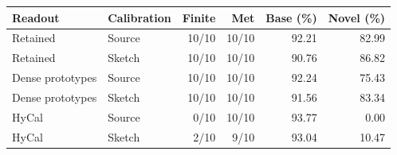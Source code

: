 \begin{tabular}{@{}llrrrr@{}}
\toprule
Readout & Calibration & Finite & Met & Base (\%) & Novel (\%) \\
\midrule
Retained & Source & 10/10 & 10/10 & 92.21 & 82.99 \\
Retained & Sketch & 10/10 & 10/10 & 90.76 & 86.82 \\
\midrule
Dense prototypes & Source & 10/10 & 10/10 & 92.24 & 75.43 \\
Dense prototypes & Sketch & 10/10 & 10/10 & 91.56 & 83.34 \\
\midrule
HyCal & Source & 0/10 & 10/10 & 93.77 & 0.00 \\
HyCal & Sketch & 2/10 & 9/10 & 93.04 & 10.47 \\
\bottomrule
\end{tabular}
